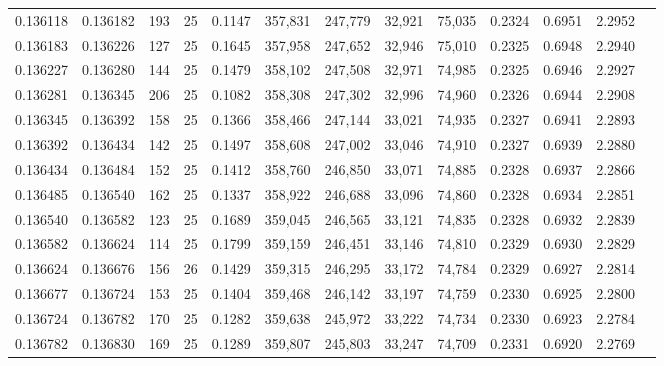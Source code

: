 \begin{tabular}{rrrrrrrrrrrrr}
0.136118 & 0.136182 &   193 &  25 &                                     0.1147 & 357,831 & 247,779 &  32,921 &  75,035 & 0.2324 & 0.6951 & 2.2952 \\
0.136183 & 0.136226 &   127 &  25 &                                     0.1645 & 357,958 & 247,652 &  32,946 &  75,010 & 0.2325 & 0.6948 & 2.2940 \\
0.136227 & 0.136280 &   144 &  25 &                                     0.1479 & 358,102 & 247,508 &  32,971 &  74,985 & 0.2325 & 0.6946 & 2.2927 \\
0.136281 & 0.136345 &   206 &  25 &                                     0.1082 & 358,308 & 247,302 &  32,996 &  74,960 & 0.2326 & 0.6944 & 2.2908 \\
0.136345 & 0.136392 &   158 &  25 &                                     0.1366 & 358,466 & 247,144 &  33,021 &  74,935 & 0.2327 & 0.6941 & 2.2893 \\
0.136392 & 0.136434 &   142 &  25 &                                     0.1497 & 358,608 & 247,002 &  33,046 &  74,910 & 0.2327 & 0.6939 & 2.2880 \\
0.136434 & 0.136484 &   152 &  25 &                                     0.1412 & 358,760 & 246,850 &  33,071 &  74,885 & 0.2328 & 0.6937 & 2.2866 \\
0.136485 & 0.136540 &   162 &  25 &                                     0.1337 & 358,922 & 246,688 &  33,096 &  74,860 & 0.2328 & 0.6934 & 2.2851 \\
0.136540 & 0.136582 &   123 &  25 &                                     0.1689 & 359,045 & 246,565 &  33,121 &  74,835 & 0.2328 & 0.6932 & 2.2839 \\
0.136582 & 0.136624 &   114 &  25 &                                     0.1799 & 359,159 & 246,451 &  33,146 &  74,810 & 0.2329 & 0.6930 & 2.2829 \\
0.136624 & 0.136676 &   156 &  26 &                                     0.1429 & 359,315 & 246,295 &  33,172 &  74,784 & 0.2329 & 0.6927 & 2.2814 \\
0.136677 & 0.136724 &   153 &  25 &                                     0.1404 & 359,468 & 246,142 &  33,197 &  74,759 & 0.2330 & 0.6925 & 2.2800 \\
0.136724 & 0.136782 &   170 &  25 &                                     0.1282 & 359,638 & 245,972 &  33,222 &  74,734 & 0.2330 & 0.6923 & 2.2784 \\
0.136782 & 0.136830 &   169 &  25 &                                     0.1289 & 359,807 & 245,803 &  33,247 &  74,709 & 0.2331 & 0.6920 & 2.2769 \\

\end{tabular}
